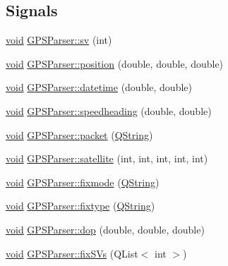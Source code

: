 \subsection*{\-Signals}
\begin{DoxyCompactItemize}
\item 
\hyperlink{group___u_a_v_objects_plugin_ga444cf2ff3f0ecbe028adce838d373f5c}{void} \hyperlink{group___g_p_s_gadget_plugin_ga5a65377c76fbafb57f377266034c7396}{\-G\-P\-S\-Parser\-::sv} (int)
\item 
\hyperlink{group___u_a_v_objects_plugin_ga444cf2ff3f0ecbe028adce838d373f5c}{void} \hyperlink{group___g_p_s_gadget_plugin_ga07f9008aa82b159a457c64d35fdaa3fc}{\-G\-P\-S\-Parser\-::position} (double, double, double)
\item 
\hyperlink{group___u_a_v_objects_plugin_ga444cf2ff3f0ecbe028adce838d373f5c}{void} \hyperlink{group___g_p_s_gadget_plugin_ga95a0ee3f47dc682adcdfd74c2d06c616}{\-G\-P\-S\-Parser\-::datetime} (double, double)
\item 
\hyperlink{group___u_a_v_objects_plugin_ga444cf2ff3f0ecbe028adce838d373f5c}{void} \hyperlink{group___g_p_s_gadget_plugin_gad43cce1299e39b4fd4f9c43eb2ebbf67}{\-G\-P\-S\-Parser\-::speedheading} (double, double)
\item 
\hyperlink{group___u_a_v_objects_plugin_ga444cf2ff3f0ecbe028adce838d373f5c}{void} \hyperlink{group___g_p_s_gadget_plugin_gaa52c8cc41458c01d411d550d1e3f3d96}{\-G\-P\-S\-Parser\-::packet} (\hyperlink{group___u_a_v_objects_plugin_gab9d252f49c333c94a72f97ce3105a32d}{\-Q\-String})
\item 
\hyperlink{group___u_a_v_objects_plugin_ga444cf2ff3f0ecbe028adce838d373f5c}{void} \hyperlink{group___g_p_s_gadget_plugin_gace7bc390ce3acaaf985eafad1b4217b3}{\-G\-P\-S\-Parser\-::satellite} (int, int, int, int, int)
\item 
\hyperlink{group___u_a_v_objects_plugin_ga444cf2ff3f0ecbe028adce838d373f5c}{void} \hyperlink{group___g_p_s_gadget_plugin_ga145563ebabd7ea6b135bad3d05cb9085}{\-G\-P\-S\-Parser\-::fixmode} (\hyperlink{group___u_a_v_objects_plugin_gab9d252f49c333c94a72f97ce3105a32d}{\-Q\-String})
\item 
\hyperlink{group___u_a_v_objects_plugin_ga444cf2ff3f0ecbe028adce838d373f5c}{void} \hyperlink{group___g_p_s_gadget_plugin_gadccc59d425cbc0c0f8da68a3438e4e22}{\-G\-P\-S\-Parser\-::fixtype} (\hyperlink{group___u_a_v_objects_plugin_gab9d252f49c333c94a72f97ce3105a32d}{\-Q\-String})
\item 
\hyperlink{group___u_a_v_objects_plugin_ga444cf2ff3f0ecbe028adce838d373f5c}{void} \hyperlink{group___g_p_s_gadget_plugin_ga53672aaf2037c7a9b389c15e69bc4d80}{\-G\-P\-S\-Parser\-::dop} (double, double, double)
\item 
\hyperlink{group___u_a_v_objects_plugin_ga444cf2ff3f0ecbe028adce838d373f5c}{void} \hyperlink{group___g_p_s_gadget_plugin_gacd7414def0621beab61941370e0dc874}{\-G\-P\-S\-Parser\-::fix\-S\-Vs} (\-Q\-List$<$ int $>$)
\end{DoxyCompactItemize}
